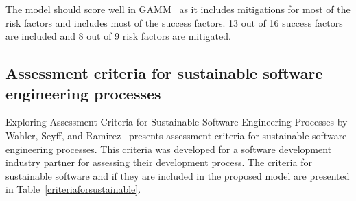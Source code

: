 The model should score well in GAMM~\cite{greenagilematurity} as it includes mitigations for most of the risk factors and includes most of the success factors. 13 out of 16 success factors are included and 8 out of 9 risk factors are mitigated.

\subsection{Assessment criteria for sustainable software engineering processes}
Exploring Assessment Criteria for Sustainable Software Engineering Processes by Wahler, Seyff, and Ramirez~\cite{assesmentcriteriaforsustainable} presents assessment criteria for sustainable software engineering processes. This criteria was developed for a software development industry partner for assessing their development process. The criteria for sustainable software and if they are included in the proposed model are presented in Table~\ref{criteriaforsustainable}.

